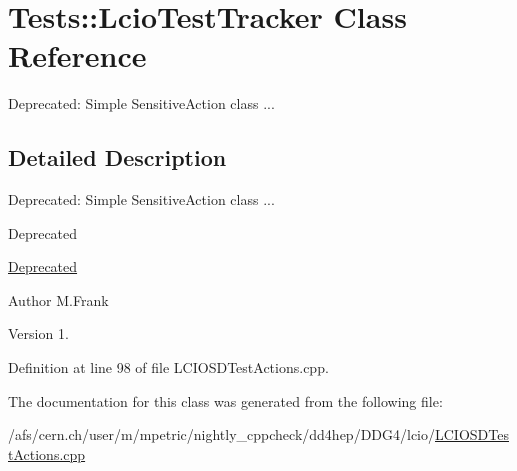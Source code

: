 \hypertarget{class_tests_1_1_lcio_test_tracker}{}\section{Tests\+:\+:Lcio\+Test\+Tracker Class Reference}
\label{class_tests_1_1_lcio_test_tracker}


Deprecated\+: Simple Sensitive\+Action class ...  




\subsection{Detailed Description}
Deprecated\+: Simple Sensitive\+Action class ... 

\begin{DoxyRefDesc}{Deprecated}
\item[\hyperlink{deprecated__deprecated000009}{Deprecated}]\end{DoxyRefDesc}
\begin{DoxyAuthor}{Author}
M.\+Frank 
\end{DoxyAuthor}
\begin{DoxyVersion}{Version}
1. 
\end{DoxyVersion}


Definition at line 98 of file L\+C\+I\+O\+S\+D\+Test\+Actions.\+cpp.



The documentation for this class was generated from the following file\+:\begin{DoxyCompactItemize}
\item 
/afs/cern.\+ch/user/m/mpetric/nightly\+\_\+cppcheck/dd4hep/\+D\+D\+G4/lcio/\hyperlink{_l_c_i_o_s_d_test_actions_8cpp}{L\+C\+I\+O\+S\+D\+Test\+Actions.\+cpp}\end{DoxyCompactItemize}
